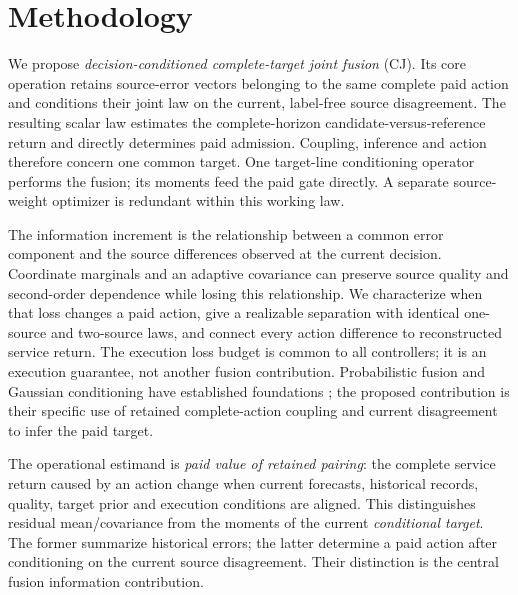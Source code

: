 \documentclass[10pt]{article}
\begin{document}
\fi

\section{Methodology}
\label{sec:methodology}

We propose \emph{decision-conditioned complete-target joint fusion} (CJ).
Its core operation retains source-error vectors belonging to the same
complete paid action and conditions their joint law on the current,
label-free source disagreement. The resulting scalar law estimates the
complete-horizon candidate-versus-reference return and directly determines
paid admission. Coupling, inference and action therefore concern one
common target. One target-line conditioning operator performs the fusion;
its moments feed the paid gate directly. A separate source-weight optimizer
is redundant within this working law.

The information increment is the relationship between a common error
component and the source differences observed at the current decision.
Coordinate marginals and an adaptive covariance can preserve source
quality and second-order dependence while losing this relationship.
We characterize when that loss changes a paid action, give a realizable
separation with identical one-source and two-source laws, and connect
every action difference to reconstructed service return. The execution
loss budget is common to all controllers; it is an execution guarantee,
not another fusion contribution. Probabilistic fusion and Gaussian
conditioning have established foundations \cite{koliander2022,minka2000};
the proposed contribution is their specific use of retained complete-action
coupling and current disagreement to infer the paid target.

The operational estimand is \emph{paid value of retained pairing}: the
complete service return caused by an action change when current forecasts,
historical records, quality, target prior and execution conditions are
aligned. This distinguishes residual mean/covariance from the moments of
the current \emph{conditional target}. The former summarize historical
errors; the latter determine a paid action after conditioning on the
current source disagreement. Their distinction is the central fusion
information contribution.
\end{document}

